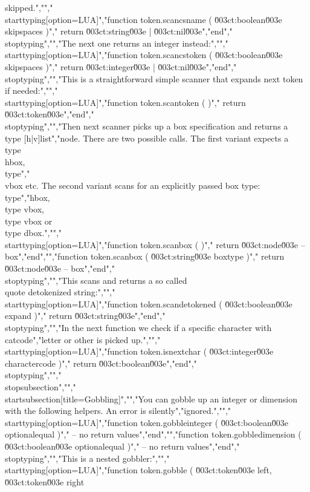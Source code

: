 skipped.","","\\starttyping[option=LUA]","function token.scancsname ( \u003ct:boolean\u003e skipspaces )","    return \u003ct:string\u003e | \u003ct:nil\u003e","end","\\stoptyping","","The next one returns an integer instead:","","\\starttyping[option=LUA]","function token.scancstoken ( \u003ct:boolean\u003e skipspaces )","    return \u003ct:integer\u003e | \u003ct:nil\u003e","end","\\stoptyping","","This is a straightforward simple scanner that expands next token if needed:","","\\starttyping[option=LUA]","function token.scantoken ( )","    return \u003ct:token\u003e","end","\\stoptyping","","Then next scanner picks up a box specification and returns a \\type {[h|v]list}","node. There are two possible calls. The first variant expects a \\type {\\hbox}, \\type","{\\vbox} etc. The second variant scans for an explicitly passed box type: \\type","{hbox}, \\type {vbox}, \\type {vbox} or \\type {dbox}.","","\\starttyping[option=LUA]","function token.scanbox ( )","    return \u003ct:node\u003e -- box","end","","function token.scanbox ( \u003ct:string\u003e boxtype )","    return \u003ct:node\u003e -- box","end","\\stoptyping","","This scans and returns a so called \\quote {detokenized} string:","","\\starttyping[option=LUA]","function token.scandetokened ( \u003ct:boolean\u003e expand )","    return \u003ct:string\u003e","end","\\stoptyping","","In the next function we check if a specific character with catcode","letter or other is picked up.","","\\starttyping[option=LUA]","function token.isnextchar ( \u003ct:integer\u003e charactercode  )","    return \u003ct:boolean\u003e","end","\\stoptyping","","\\stopsubsection","","\\startsubsection[title={Gobbling}]","","You can gobble up an integer or dimension with the following helpers. An error is silently","ignored.","","\\starttyping[option=LUA]","function token.gobbleinteger ( \u003ct:boolean\u003e optionalequal )","    -- no return values","end","","function token.gobbledimension ( \u003ct:boolean\u003e optionalequal )","    -- no return values","end","\\stoptyping","","This is a nested gobbler:","","\\starttyping[option=LUA]","function token.gobble ( \u003ct:token\u003e left, \u003ct:token\u003e right 